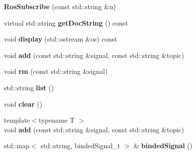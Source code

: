 \begin{DoxyCompactItemize}
\item 
{\bfseries Ros\+Subscribe} (const std\+::string \&n)\hypertarget{classdynamic__graph_1_1RosSubscribe_ae0e13e1ae910901aed4aa3875c4cc6f8}{}\label{classdynamic__graph_1_1RosSubscribe_ae0e13e1ae910901aed4aa3875c4cc6f8}

\item 
virtual std\+::string {\bfseries get\+Doc\+String} () const \hypertarget{classdynamic__graph_1_1RosSubscribe_a573d8ec26392e762f99d12c8aaf06817}{}\label{classdynamic__graph_1_1RosSubscribe_a573d8ec26392e762f99d12c8aaf06817}

\item 
void {\bfseries display} (std\+::ostream \&os) const \hypertarget{classdynamic__graph_1_1RosSubscribe_a6403273d5b82d48e19b81c04c9db6ffe}{}\label{classdynamic__graph_1_1RosSubscribe_a6403273d5b82d48e19b81c04c9db6ffe}

\item 
void {\bfseries add} (const std\+::string \&signal, const std\+::string \&topic)\hypertarget{classdynamic__graph_1_1RosSubscribe_a5ea4e0b7da520ce291a1814935b25d50}{}\label{classdynamic__graph_1_1RosSubscribe_a5ea4e0b7da520ce291a1814935b25d50}

\item 
void {\bfseries rm} (const std\+::string \&signal)\hypertarget{classdynamic__graph_1_1RosSubscribe_a21d955435830639a8c02c4ef33c49849}{}\label{classdynamic__graph_1_1RosSubscribe_a21d955435830639a8c02c4ef33c49849}

\item 
std\+::string {\bfseries list} ()\hypertarget{classdynamic__graph_1_1RosSubscribe_a863629270bc4c682b45f41471f858e8c}{}\label{classdynamic__graph_1_1RosSubscribe_a863629270bc4c682b45f41471f858e8c}

\item 
void {\bfseries clear} ()\hypertarget{classdynamic__graph_1_1RosSubscribe_a33d08228f31cef91c35f83fee6f30bdc}{}\label{classdynamic__graph_1_1RosSubscribe_a33d08228f31cef91c35f83fee6f30bdc}

\item 
{\footnotesize template$<$typename T $>$ }\\void {\bfseries add} (const std\+::string \&signal, const std\+::string \&topic)\hypertarget{classdynamic__graph_1_1RosSubscribe_a4b19a0b90769381dd89c90a611fc0cbb}{}\label{classdynamic__graph_1_1RosSubscribe_a4b19a0b90769381dd89c90a611fc0cbb}

\item 
std\+::map$<$ std\+::string, binded\+Signal\+\_\+t $>$ \& {\bfseries binded\+Signal} ()\hypertarget{classdynamic__graph_1_1RosSubscribe_a09004dab7209ce50d235295fa7c7ec0d}{}\label{classdynamic__graph_1_1RosSubscribe_a09004dab7209ce50d235295fa7c7ec0d}


\end{DoxyCompactItemize}
